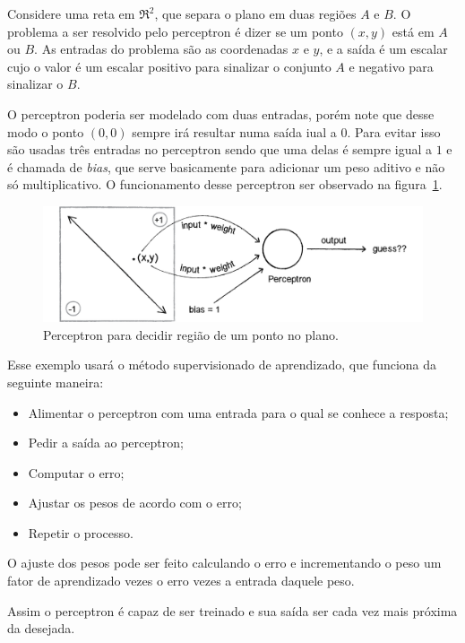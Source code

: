 Considere uma reta em $\Re^2$, que separa o plano em duas regiões $A$ e $B$. O problema a
ser resolvido pelo perceptron é dizer se um ponto $(x,y)$ está em $A$ ou $B$. As entradas do
problema são as coordenadas $x$ e $y$, e a saída é um escalar cujo o valor é um escalar positivo
para sinalizar o conjunto $A$ e negativo para sinalizar o $B$.

O perceptron poderia ser modelado com duas entradas, porém note que desse modo o
ponto $(0,0)$ sempre irá resultar numa saída iual a $0$. Para evitar isso são usadas três entradas
no perceptron sendo que uma delas é sempre igual a $1$ e é chamada de \emph{bias}, que serve
basicamente para adicionar um peso aditivo e não só multiplicativo. O funcionamento desse perceptron
ser observado na figura~\ref{fig:rede_neural_simple_problem}.

\begin{figure}[H]
\centering
\includegraphics[width=15cm]{figuras/rede_neural_simple_problem}
\caption{Perceptron para decidir região de um ponto no plano.}\label{fig:rede_neural_simple_problem}
\end{figure}

Esse exemplo usará o método supervisionado de aprendizado, que funciona da seguinte maneira:

\begin{itemize}
\item
  Alimentar o perceptron com uma entrada para o qual se conhece a resposta;
\item
  Pedir a saída ao perceptron;
\item
  Computar o erro;
\item
  Ajustar os pesos de acordo com o erro;
\item
  Repetir o processo.
\end{itemize}

O ajuste dos pesos pode ser feito calculando o erro e incrementando o peso um fator de
aprendizado vezes o erro vezes a entrada daquele peso.

Assim o perceptron é capaz de ser treinado e sua saída ser cada vez mais próxima da desejada.


